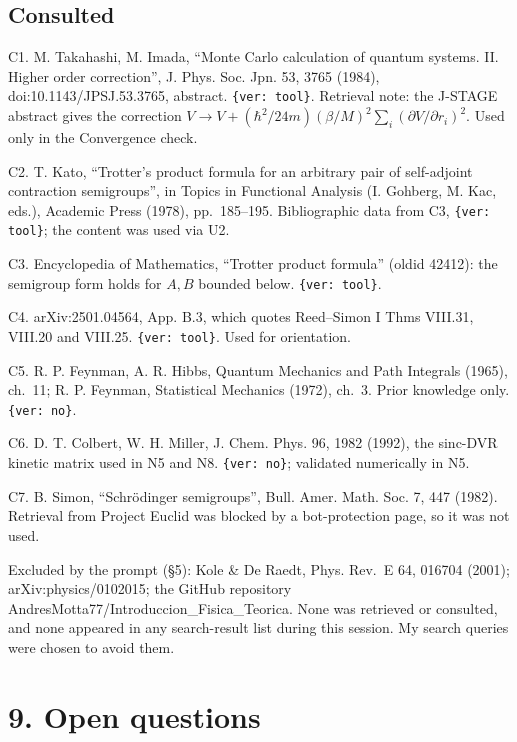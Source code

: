 \documentclass[11pt,a4paper]{article}
\begin{document}
\hypertarget{consulted}{%
\subsection{Consulted}\label{consulted}}

C1. M. Takahashi, M. Imada, ``Monte Carlo calculation of quantum systems. II. Higher order correction'', J. Phys. Soc. Jpn. 53, 3765 (1984), doi:10.1143/JPSJ.53.3765, abstract. \texttt{\{ver: tool\}}. Retrieval note: the J-STAGE abstract gives the correction \(V\to V+(\hbar^2/24m)(\beta/M)^2\sum_i(\partial V/\partial r_i)^2\). Used only in the Convergence check.

C2. T. Kato, ``Trotter's product formula for an arbitrary pair of self-adjoint contraction semigroups'', in Topics in Functional Analysis (I. Gohberg, M. Kac, eds.), Academic Press (1978), pp.~185--195. Bibliographic data from C3, \texttt{\{ver: tool\}}; the content was used via U2.

C3. Encyclopedia of Mathematics, ``Trotter product formula'' (oldid 42412): the semigroup form holds for \(A,B\) bounded below. \texttt{\{ver: tool\}}.

C4. arXiv:2501.04564, App. B.3, which quotes Reed--Simon I Thms VIII.31, VIII.20 and VIII.25. \texttt{\{ver: tool\}}. Used for orientation.

C5. R. P. Feynman, A. R. Hibbs, Quantum Mechanics and Path Integrals (1965), ch.~11; R. P. Feynman, Statistical Mechanics (1972), ch.~3. Prior knowledge only. \texttt{\{ver: no\}}.

C6. D. T. Colbert, W. H. Miller, J. Chem. Phys. 96, 1982 (1992), the sinc-DVR kinetic matrix used in N5 and N8. \texttt{\{ver: no\}}; validated numerically in N5.

C7. B. Simon, ``Schrödinger semigroups'', Bull. Amer. Math. Soc. 7, 447 (1982). Retrieval from Project Euclid was blocked by a bot-protection page, so it was not used.

Excluded by the prompt (§5): Kole \& De Raedt, Phys. Rev.~E 64, 016704 (2001); arXiv:physics/0102015; the GitHub repository AndresMotta77/Introduccion\_Fisica\_Teorica. None was retrieved or consulted, and none appeared in any search-result list during this session. My search queries were chosen to avoid them.

\hypertarget{open-questions}{%
\section{9. Open questions}\label{open-questions}}
\end{document}
